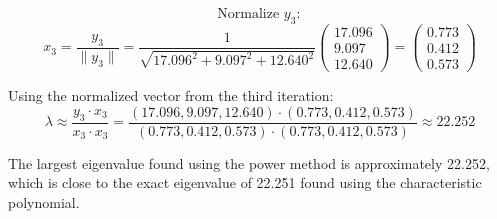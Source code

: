 \documentclass{article}
\begin{document}
\[ \text{Normalize } y_3: \]
\[ x_3 = \frac{y_3}{\| y_3 \|} = \frac{1}{\sqrt{17.096^2 + 9.097^2 + 12.640^2}} \begin{pmatrix} 17.096 \\ 9.097 \\ 12.640 \end{pmatrix} = \begin{pmatrix} 0.773 \\ 0.412 \\ 0.573 \end{pmatrix} \]

Using the normalized vector from the third iteration:
\[ \lambda \approx \frac{y_3 \cdot x_3}{x_3 \cdot x_3} = \frac{(17.096, 9.097, 12.640) \cdot (0.773, 0.412, 0.573)}{(0.773, 0.412, 0.573) \cdot (0.773, 0.412, 0.573)} \approx 22.252 \]

The largest eigenvalue found using the power method is approximately 22.252, which is close to the exact eigenvalue of 22.251 found using the characteristic polynomial.







\end{document}
